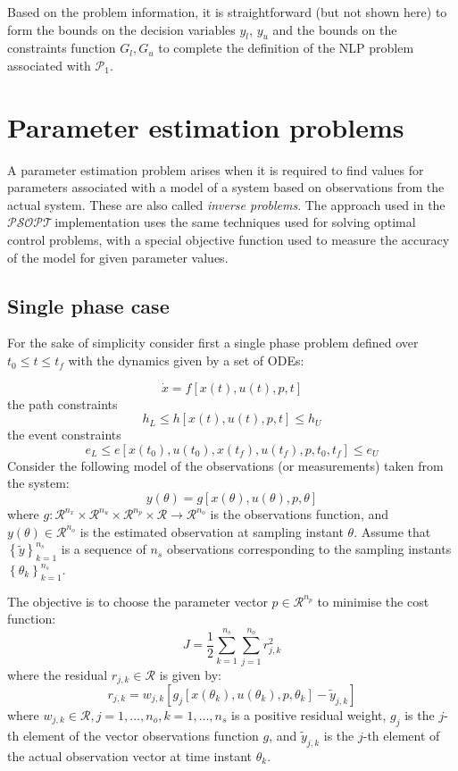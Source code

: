 \documentclass[a4paper,11pt]{report}    %
\newcommand{\psopt}{$\mathcal{PSOPT}$\,}  %
\newcommand{\RE}{\mathcal{R}}
\begin{document}
Based on the problem information, it is straightforward (but not shown here) to form the bounds on the decision variables $y_l$, $y_u$
and the bounds on the constraints function $G_l, G_u$ to complete the definition of the NLP problem associated
with $\mathcal{P}_1$.

 
\section{Parameter estimation problems} \label{sec:param_estim}

A parameter estimation problem arises when it is required to find values for parameters associated
with a model of a system based on observations from the actual system. These are also called \emph{inverse problems}.
The approach used in the \psopt implementation uses the same techniques used for solving optimal control
problems, with a special objective function used to measure the accuracy of the model for given parameter
values. 


\subsection{Single phase case}

For the sake of simplicity consider first a single phase problem defined over $t_0 \le t \le t_f$ with the
dynamics given by a set of ODEs:

\[
   \dot x = f[ x(t), u(t), p, t ]
\]
the path constraints
\[
  h_L \le h[ x(t), u(t), p, t ] \le h_U
\]
the event constraints
\[
   e_L \le e[ x(t_0), u(t_0), x(t_f), u(t_f), p, t_0, t_f ] \le e_U
\]
Consider the following model of the observations (or measurements) taken from the system:
\[
  y(\theta) = g[ x(\theta), u(\theta), p, \theta ]
\]
where $g:\RE^{n_x} \times \RE^{n_u} \times \RE^{n_p} \times \RE \rightarrow \RE^{n_o}$ is the observations function, and $y(\theta) \in \RE^{n_o}$ is
the estimated observation at sampling instant $\theta$.
Assume that  $\left\{ \tilde{y} \right\}_{k=1}^{n_s}$ is a sequence of $n_s$  observations  corresponding to the sampling instants 
$\left\{ \theta_k \right\}_{k=1}^{n_s}$. 

The objective is to choose the parameter vector $p \in \RE^{n_p}$ to 
minimise the cost function:
\[
 J = \frac{1}{2} \sum\limits_{k=1}^{n_s} \sum\limits_{j=1}^{n_o} r_{j,k}^2  
\]
where the residual $r_{j,k} \in \RE$ is given by:
\[
   r_{j,k} = w_{j,k} [g_j[x(\theta_k), u(\theta_k), p, \theta_k] - \tilde{y}_{j,k}]
\]
where $w_{j,k} \in \RE, j=1,\ldots,n_o, k=1,\ldots,n_s$ is 
a positive residual weight, $g_{j}$ is the $j$-th element of the vector observations function $g$, 
and $\tilde{y}_{j,k}$ is the $j$-th element of the actual observation vector at time instant $\theta_k$.
\end{document}
